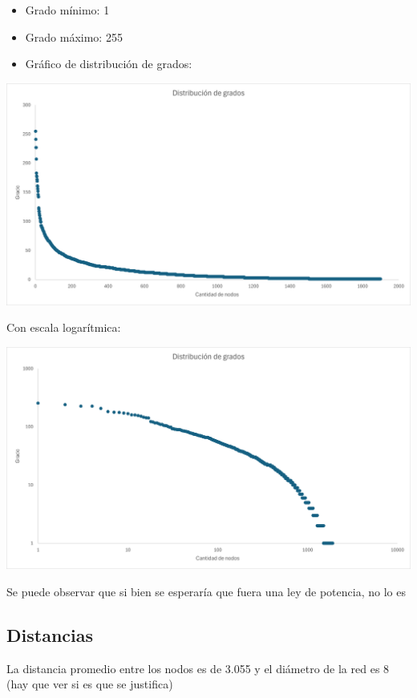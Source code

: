 \documentclass[12pt]{article}
\begin{document}
\begin{itemize}
    \item Grado mínimo: 1
    \item Grado máximo: 255
    \item Gráfico de distribución de grados: 
\end{itemize}
\begin{center}
    \includegraphics[scale=0.35]{images/distribucion_grados.png}
\end{center}
Con escala logarítmica:

\begin{center}
    \includegraphics[scale=0.35]{images/distribucion_grados_log_log.png}
\end{center}

Se puede observar que si bien se esperaría que fuera una ley de potencia, no lo es 
\subsection{Distancias} 
La distancia promedio entre los nodos es de 3.055 y el diámetro de la red es 8
(hay que ver si es que se justifica)
\end{document}
